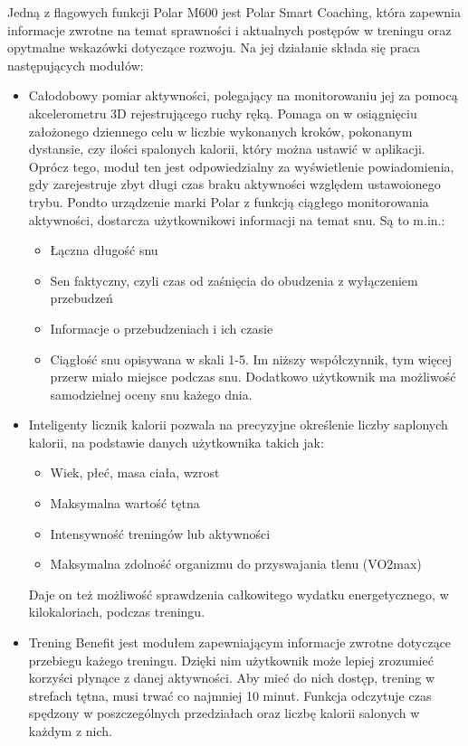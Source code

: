 \documentclass[a4paper,12pt,reqno]{article}
\begin{document}
Jedną z flagowych funkcji Polar M600 jest Polar Smart Coaching, która zapewnia informacje zwrotne na temat sprawności i aktualnych postępów w treningu oraz opytmalne wskazówki dotyczące rozwoju. Na jej działanie składa się praca następujących modułów:
\begin{itemize}
	\item Całodobowy pomiar aktywności, polegający na monitorowaniu jej za pomocą akcelerometru 3D rejestrującego ruchy ręką. Pomaga on w osiągnięciu założonego dziennego celu w liczbie wykonanych kroków, pokonanym dystansie, czy ilości spalonych kalorii, który można ustawić w aplikacji. Oprócz tego, moduł ten jest odpowiedzialny za wyświetlenie powiadomienia, gdy zarejestruje zbyt długi czas braku aktywności względem ustawoionego trybu.
	Pondto urządzenie marki Polar z funkcją ciągłego monitorowania aktywności, dostarcza użytkownikowi informacji na temat snu. Są to m.in.:
	\begin{itemize}
		\item Łączna długość snu
		\item Sen faktyczny, czyli czas od zaśnięcia do obudzenia z wyłączeniem przebudzeń
		\item Informacje o przebudzeniach i ich czasie
		\item Ciągłość snu opisywana w skali 1-5. Im niższy współczynnik, tym więcej przerw miało miejsce podczas snu.
		Dodatkowo użytkownik ma możliwość samodzielnej oceny snu każego dnia.
	\end{itemize}
	\item Inteligenty licznik kalorii pozwala na precyzyjne określenie liczby saplonych kalorii, na podstawie danych użytkownika takich jak:
	\begin{itemize}
		\item Wiek, płeć, masa ciała, wzrost
		\item Maksymalna wartość tętna
		\item Intensywność treningów lub aktywności
		\item Maksymalna zdolność organizmu do przyswajania tlenu (VO2max)
	\end{itemize}
	Daje on też możliwość sprawdzenia całkowitego wydatku energetycznego, w kilokaloriach, podczas treningu.
	\item Trening Benefit jest modułem zapewniającym informacje zwrotne dotyczące przebiegu każego treningu. Dzięki nim użytkownik może lepiej zrozumieć korzyści płynące z danej aktywności. Aby mieć do nich dostęp, trening w strefach tętna, musi trwać co najmniej 10 minut. Funkcja odczytuje czas spędzony w poszczególnych przedziałach oraz liczbę kalorii salonych w każdym z nich.

\end{itemize}
\end{document}
